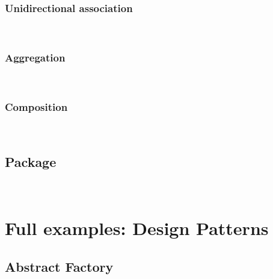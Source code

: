 \documentclass{article}
\newcommand{\demo}[1]{
\begin{minipage}{.5\linewidth}

\end{minipage}~~~~~~~~~~~~~~
\begin{minipage}{.45\linewidth}
\resizebox{\linewidth}{!}{

}
\end{minipage}
}
\newcommand{\example}[1]{

\resizebox{\linewidth}{!}{

}
}
\begin{document}
\subsubsection{Unidirectional association}
\demo{unidirectional-association}

\subsubsection{Aggregation}
\demo{aggregation}

\subsubsection{Composition}
\demo{composition}

\subsection{Package}
\demo{package}

\section{Full examples: Design Patterns}
\subsection{Abstract Factory}
\example{abstract-factory}
\end{document}
